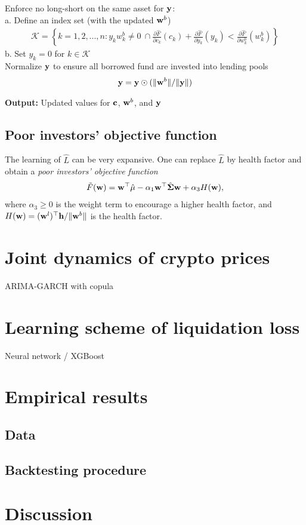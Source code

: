 \documentclass{article} %
\newcommand{\INDSTATE}[1][1]{\hspace{#1\algorithmicindent}}
\theoremstyle{plain}
\theoremstyle{definition} %
\begin{document}
\begin{algorithm}[th]
\begin{algorithmic}[1]
    \STATE Enforce no long-short on the same asset for ${\bf y}$:\\
    \INDSTATE a. Define an index set (with the updated ${\bf w}^b$)
    \begin{align*} 
      \mathcal{K} = \left\{
        k=1,2,...,n: y_k w^b_k\neq 0\ \cap 
      \frac{\partial \hat F}{\partial c_k}(c_k) + \frac{\partial \hat F}{\partial y_k}(y_k) < \frac{\partial \hat F}{\partial w^b_k}(w^b_k)
      \right\}
    \end{align*}
    \INDSTATE b. Set $y_k=0$ for $k \in \mathcal{K}$\\
    
    \STATE Normalize ${\bf y}$ to ensure all borrowed fund are invested into lending pools
     \begin{align*}{\bf y} = {\bf y} \odot (\|{\bf w}^b\|/ \|{\bf y}\|)\end{align*}
    
    \STATE \textbf{Output:} Updated values for ${\bf c}$, ${\bf w}^b$, and ${\bf y}$
    \end{algorithmic}
  \end{algorithm}


\subsection{Poor investors' objective function}
The learning of $\hat L$ can be very expansive. 
 One can replace $\hat L$ by health factor and obtain a \textit{poor investors' objective function}
 \begin{align}
  \tilde F({\bf w}) = {\bf w}^\top \hat {\bf \mu} - \alpha_1 {\bf w}^\top \hat {\bf \Sigma}{\bf w} + \alpha_3 H({\bf w}),
 \end{align}
 where $\alpha_3 \geq 0$ is the weight term to encourage a higher health factor, and $H({\bf w}) = ({\bf w}^l)^\top{\bf h}/\|{\bf w}^b\|$ is the health factor. 

\section{Joint dynamics of crypto prices}
ARIMA-GARCH with copula

\section{Learning scheme of liquidation loss}\label{sec:ML}
Neural network / XGBoost

\section{Empirical results}
\subsection{Data}
\subsection{Backtesting procedure}

\section{Discussion}

\end{document}
